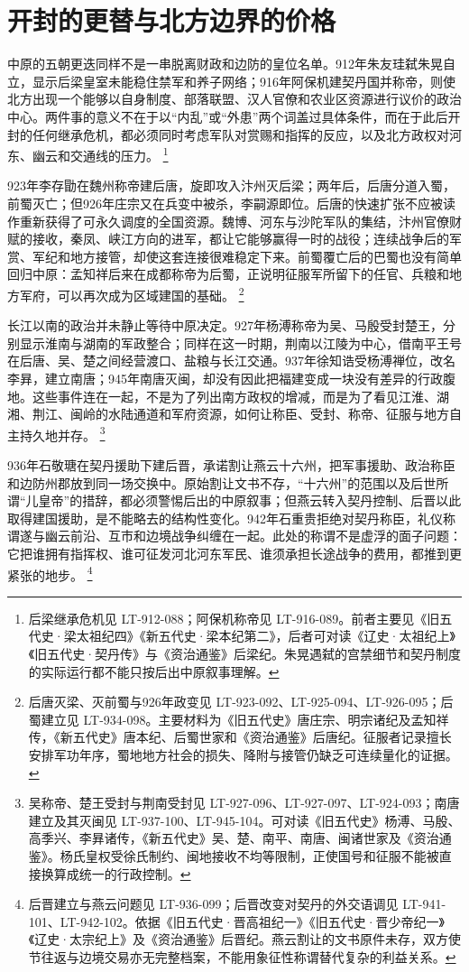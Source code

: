 \section{开封的更替与北方边界的价格}

中原的五朝更迭同样不是一串脱离财政和边防的皇位名单。912年朱友珪弑朱晃自立，显示后梁皇室未能稳住禁军和养子网络；916年阿保机建契丹国并称帝，则使北方出现一个能够以自身制度、部落联盟、汉人官僚和农业区资源进行议价的政治中心。两件事的意义不在于以“内乱”或“外患”两个词盖过具体条件，而在于此后开封的任何继承危机，都必须同时考虑军队对赏赐和指挥的反应，以及北方政权对河东、幽云和交通线的压力。%
\footnote{后梁继承危机见 LT-912-088；阿保机称帝见 LT-916-089。前者主要见《旧五代史·梁太祖纪四》《新五代史·梁本纪第二》，后者可对读《辽史·太祖纪上》《旧五代史·契丹传》与《资治通鉴》后梁纪。朱晃遇弑的宫禁细节和契丹制度的实际运行都不能只按后出中原叙事理解。}

923年李存勖在魏州称帝建后唐，旋即攻入汴州灭后梁；两年后，后唐分道入蜀，前蜀灭亡；但926年庄宗又在兵变中被杀，李嗣源即位。后唐的快速扩张不应被读作重新获得了可永久调度的全国资源。魏博、河东与沙陀军队的集结，汴州官僚财赋的接收，秦凤、峡江方向的进军，都让它能够赢得一时的战役；连续战争后的军赏、军纪和地方接管，却使这套连接很难稳定下来。前蜀覆亡后的巴蜀也没有简单回归中原：孟知祥后来在成都称帝为后蜀，正说明征服军所留下的任官、兵粮和地方军府，可以再次成为区域建国的基础。%
\footnote{后唐灭梁、灭前蜀与926年政变见 LT-923-092、LT-925-094、LT-926-095；后蜀建立见 LT-934-098。主要材料为《旧五代史》唐庄宗、明宗诸纪及孟知祥传，《新五代史》唐本纪、后蜀世家和《资治通鉴》后唐纪。征服者记录擅长安排军功年序，蜀地地方社会的损失、降附与接管仍缺乏可连续量化的证据。}

长江以南的政治并未静止等待中原决定。927年杨溥称帝为吴、马殷受封楚王，分别显示淮南与湖南的军政整合；同样在这一时期，荆南以江陵为中心，借南平王号在后唐、吴、楚之间经营渡口、盐粮与长江交通。937年徐知诰受杨溥禅位，改名李昪，建立南唐；945年南唐灭闽，却没有因此把福建变成一块没有差异的行政腹地。这些事件连在一起，不是为了列出南方政权的增减，而是为了看见江淮、湖湘、荆江、闽岭的水陆通道和军府资源，如何让称臣、受封、称帝、征服与地方自主持久地并存。%
\footnote{吴称帝、楚王受封与荆南受封见 LT-927-096、LT-927-097、LT-924-093；南唐建立及其灭闽见 LT-937-100、LT-945-104。可对读《旧五代史》杨溥、马殷、高季兴、李昪诸传，《新五代史》吴、楚、南平、南唐、闽诸世家及《资治通鉴》。杨氏皇权受徐氏制约、闽地接收不均等限制，正使国号和征服不能被直接换算成统一的行政控制。}

936年石敬瑭在契丹援助下建后晋，承诺割让燕云十六州，把军事援助、政治称臣和边防州郡放到同一场交换中。原始割让文书不存，“十六州”的范围以及后世所谓“儿皇帝”的措辞，都必须警惕后出的中原叙事；但燕云转入契丹控制、后晋以此取得建国援助，是不能略去的结构性变化。942年石重贵拒绝对契丹称臣，礼仪称谓遂与幽云前沿、互市和边境战争纠缠在一起。此处的称谓不是虚浮的面子问题：它把谁拥有指挥权、谁可征发河北河东军民、谁须承担长途战争的费用，都推到更紧张的地步。%
\footnote{后晋建立与燕云问题见 LT-936-099；后晋改变对契丹的外交语调见 LT-941-101、LT-942-102。依据《旧五代史·晋高祖纪一》《旧五代史·晋少帝纪一》《辽史·太宗纪上》及《资治通鉴》后晋纪。燕云割让的文书原件未存，双方使节往返与边境交易亦无完整档案，不能用象征性称谓替代复杂的利益关系。}

